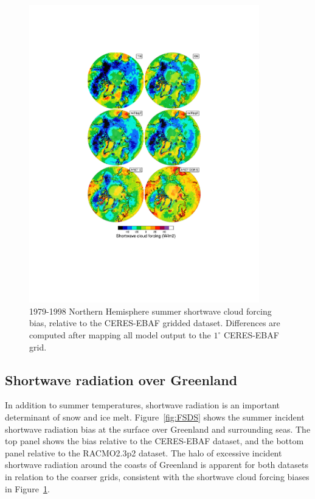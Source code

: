 \documentclass[draft]{agujournal2019}
\begin{document}
\begin{figure}[t]
\begin{center}
         \includegraphics[width=100mm]{figs/temp_contours_diffCERES_SWCF.pdf}
\end{center}
\caption{1979-1998 Northern Hemisphere summer shortwave cloud forcing bias, relative to the CERES-EBAF gridded dataset. Differences are computed after mapping all model output to the $1^{\circ}$ CERES-EBAF grid.}
\label{fig:SWCF}
\end{figure}

\subsection{Shortwave radiation over Greenland}

In addition to summer temperatures, shortwave radiation is an important determinant of snow and ice melt. Figure~\ref{fig:FSDS} shows the summer incident shortwave radiation bias at the surface over Greenland and surrounding seas. The top panel shows the bias relative to the CERES-EBAF dataset, and the bottom panel relative to the RACMO2.3p2 dataset.
The halo of excessive incident shortwave radiation around the coasts of Greenland is apparent for both datasets in relation to the coarser grids, consistent with the shortwave cloud forcing biases in Figure~\ref{fig:SWCF}.
\end{document}
